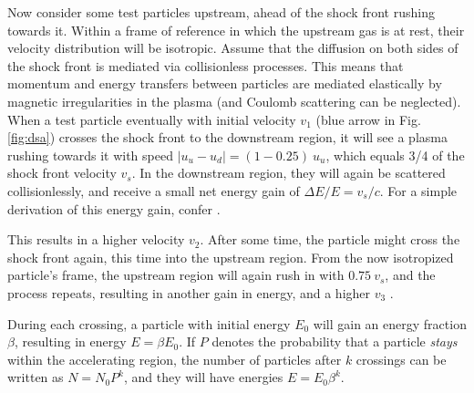 \documentclass[
    a4paper, %
    fontsize=10pt, %
    twoside=false, %
    numbers=noenddot, %
    fontmethod=tex,
]{kaobook}
\begin{document}
Now consider some test particles upstream, ahead of the shock front rushing towards it. Within a frame of reference in which the upstream gas is at rest, their velocity distribution will be isotropic. Assume that the diffusion on both sides of the shock front is mediated via collisionless processes. This means that momentum and energy transfers between particles are mediated elastically by magnetic irregularities in the plasma (and Coulomb scattering can be neglected). When a test particle eventually with initial velocity $v_1$ (blue arrow in Fig. \ref{fig:dsa}) crosses the shock front to the downstream region, it will see a plasma rushing towards it with speed $|u_u-u_d| = (1-0.25)~u_u$, which equals 3/4 of the shock front velocity $v_s$. In the downstream region, they will again be scattered collisionlessly, and receive a small net energy gain of $\Delta E/E = v_s/c$. For a simple derivation of this energy gain, confer \cite{Longair2011}.

This results in a higher velocity $v_2$. After some time, the particle might cross the shock front again, this time into the upstream region. From the now isotropized particle's frame, the upstream region will again rush in with $0.75~v_s$, and the process repeats, resulting in another gain in energy, and a higher $v_3$ .

During each crossing, a particle with initial energy $E_0$ will gain an energy fraction $\beta$, resulting in energy $E=\beta E_0$. If $P$ denotes the probability that a particle \textit{stays} within the accelerating region, the number of particles after $k$ crossings can be written as $N=N_0 P^k $, and they will have energies $E=E_0\beta^k$.
\end{document}
